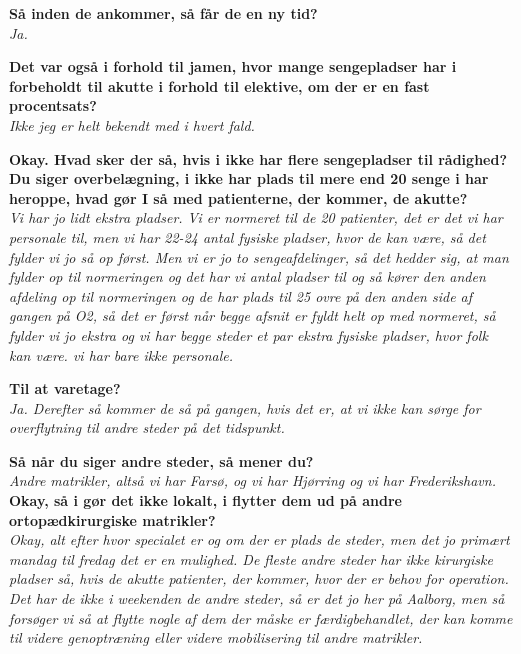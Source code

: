\textbf{Så inden de ankommer, så får de en ny tid?} \\
\noindent
\textit{Ja.} \\
\noindent

\textbf{Det var også i forhold til jamen, hvor mange sengepladser har i forbeholdt til akutte i forhold til elektive, om der er en fast procentsats?} \\
\noindent
\textit{Ikke jeg er helt bekendt med i hvert fald.} \\
\noindent

\textbf{Okay. Hvad sker der så, hvis i ikke har flere sengepladser til rådighed? Du siger overbelægning, i ikke har plads til mere end 20 senge i har heroppe, hvad gør I så med patienterne, der kommer, de akutte?} \\
\noindent
\textit{Vi har jo lidt ekstra pladser. Vi er normeret til de 20 patienter, det er det vi har personale til, men vi har 22-24 antal fysiske pladser, hvor de kan være, så det fylder vi jo så op først. Men vi er jo to sengeafdelinger, så det hedder sig, at man fylder op til normeringen og det har vi antal pladser til og så kører den anden afdeling op til normeringen og de har plads til 25 ovre på den anden side af gangen på O2, så det er først når begge afsnit er fyldt helt op med normeret, så fylder vi jo ekstra og vi har begge steder et par ekstra fysiske pladser, hvor folk kan være. vi har bare ikke personale.} \\
\noindent

\textbf{Til at varetage?} \\
\noindent
\textit{Ja. Derefter så kommer de så på gangen, hvis det er, at vi ikke kan sørge for overflytning til andre steder på det tidspunkt.} \\
\noindent


\textbf{Så når du siger andre steder, så mener du?} \\
\noindent
\textit{Andre matrikler, altså vi har Farsø, og vi har Hjørring og vi har Frederikshavn.} \\
\noindent
\textbf{Okay, så i gør det ikke lokalt, i flytter dem ud på andre ortopædkirurgiske matrikler?} \\
\noindent
\textit{Okay, alt efter hvor specialet er og om der er plads de steder, men det jo primært mandag til fredag det er en mulighed. De fleste andre steder har ikke kirurgiske pladser så, hvis de akutte patienter, der kommer, hvor der er behov for operation. Det har de ikke i weekenden de andre steder, så er det jo her på Aalborg, men så forsøger vi så at flytte nogle af dem der måske er færdigbehandlet, der kan komme til videre genoptræning eller videre mobilisering til andre matrikler. } \\
\noindent


